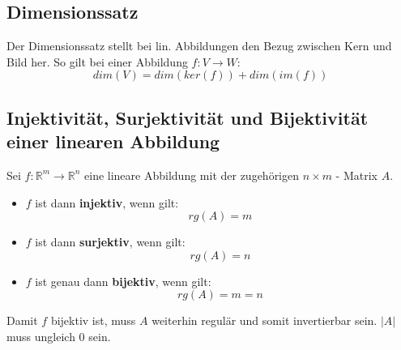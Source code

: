 \subsection{Dimensionssatz}
\label{sub:dimensionssatz}

Der Dimensionssatz stellt bei lin. Abbildungen den Bezug zwischen Kern und Bild her.
So gilt bei einer Abbildung $f : V \rightarrow W$:
\begin{equation}
	dim(V) = dim(ker(f)) + dim(im(f))
\end{equation}

\subsection{Injektivit\"{a}t, Surjektivit\"{a}t und Bijektivit\"{a}t einer linearen Abbildung}
\label{sub:injektivitaet_surjektivitaet_und_bijektivitaet_einer_linearen_abbildung}

Sei $f : \mathbb{R}^m \rightarrow \mathbb{R}^n$ eine lineare Abbildung mit der zugehörigen $n \times m$ - Matrix $A$.

\begin{itemize}
	\item $f$ ist dann \textbf{injektiv}, wenn gilt: \begin{equation} rg(A) = m \end{equation}
	\item $f$ ist dann \textbf{surjektiv}, wenn gilt: \begin{equation} rg(A) = n \end{equation}
	\item $f$ ist genau dann \textbf{bijektiv}, wenn gilt: \begin{equation} rg(A) = m = n\end{equation}
\end{itemize}

Damit $f$ bijektiv ist, muss $A$ weiterhin regulär und somit invertierbar sein. $|A|$ muss ungleich $0$ sein.